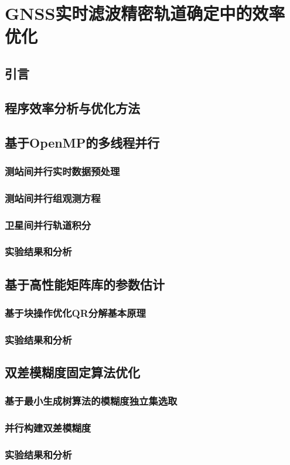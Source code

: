 
\chapter{GNSS实时滤波精密轨道确定中的效率优化}

\section{引言}

\section{程序效率分析与优化方法}

\section{基于OpenMP的多线程并行}

\subsection{测站间并行实时数据预处理}

\subsection{测站间并行组观测方程}

\subsection{卫星间并行轨道积分}

\subsection{实验结果和分析}

\section{基于高性能矩阵库的参数估计}

\subsection{基于块操作优化QR分解基本原理}

\subsection{实验结果和分析}

\section{双差模糊度固定算法优化}

\subsection{基于最小生成树算法的模糊度独立集选取}

\subsection{并行构建双差模糊度}

\subsection{实验结果和分析}
